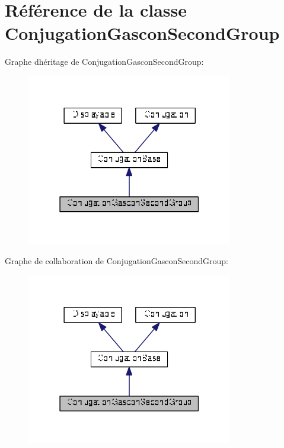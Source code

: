 \hypertarget{class_conjugation_gascon_second_group}{}\section{Référence de la classe Conjugation\+Gascon\+Second\+Group}
\label{class_conjugation_gascon_second_group}


Graphe d\textquotesingle{}héritage de Conjugation\+Gascon\+Second\+Group\+:
\nopagebreak
\begin{figure}[H]
\begin{center}
\leavevmode
\includegraphics[width=255pt]{class_conjugation_gascon_second_group__inherit__graph}
\end{center}
\end{figure}


Graphe de collaboration de Conjugation\+Gascon\+Second\+Group\+:
\nopagebreak
\begin{figure}[H]
\begin{center}
\leavevmode
\includegraphics[width=255pt]{class_conjugation_gascon_second_group__coll__graph}
\end{center}
\end{figure}

